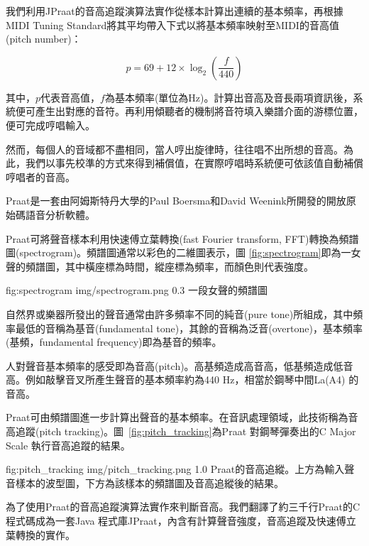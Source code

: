 \documentclass[12pt,a4paper,oneside]{report}
\begin{document}
我們利用JPraat的音高追蹤演算法實作從樣本計算出連續的基本頻率，再根據MIDI Tuning Standard\cite{midiTuningStrandard}將其平均帶入下式以將基本頻率映射至MIDI的音高值(pitch number)：

\[
p=69+12\times\log_2{\left(\frac{f}{440}\right)}
\]

其中，\(p\)代表音高值，\(f\)為基本頻率(單位為Hz)。計算出音高及音長兩項資訊後，系統便可產生出對應的音符。再利用傾聽者的機制將音符填入樂譜介面的游標位置，便可完成哼唱輸入。

然而，每個人的音域都不盡相同，當人哼出旋律時，往往唱不出所想的音高。為此，我們以事先校準的方式來得到補償值，在實際哼唱時系統便可依該值自動補償哼唱者的音高。


Praat\cite{praat}是一套由阿姆斯特丹大學的Paul Boersma和David Weenink所開發的開放原始碼語音分析軟體。

Praat可將聲音樣本利用快速傅立葉轉換(fast Fourier transform, FFT)轉換為頻譜圖(spectrogram)。頻譜圖通常以彩色的二維圖表示，圖 \ref{fig:spectrogram}即為一女聲的頻譜圖，其中橫座標為時間，縱座標為頻率，而顏色則代表強度。

\figurewithcaption
{fig:spectrogram}
{img/spectrogram.png}
{0.3}
{一段女聲的頻譜圖}

自然界或樂器所發出的聲音通常由許多頻率不同的純音(pure tone)所組成，其中頻率最低的音稱為基音(fundamental tone)，其餘的音稱為泛音(overtone)，基本頻率(基頻，fundamental frequency)即為基音的頻率。

人對聲音基本頻率的感受即為音高(pitch)。高基頻造成高音高，低基頻造成低音高。例如敲擊音叉所產生聲音的基本頻率約為440 Hz，相當於鋼琴中間La(A4) 的音高。

Praat可由頻譜圖進一步計算出聲音的基本頻率。在音訊處理領域，此技術稱為音高追蹤(pitch tracking)。圖~\ref{fig:pitch_tracking}為Praat 對鋼琴彈奏出的C Major Scale 執行音高追蹤的結果。


\figurewithcaption
{fig:pitch_tracking}
{img/pitch_tracking.png}
{1.0}
{Praat的音高追縱。上方為輸入聲音樣本的波型圖，下方為該樣本的頻譜圖及音高追縱後的結果。}

為了使用Praat的音高追蹤演算法實作來判斷音高。我們翻譯了約三千行Praat的C 程式碼成為一套Java 程式庫JPraat，內含有計算聲音強度，音高追蹤及快速傅立葉轉換的實作。


\end{document}
